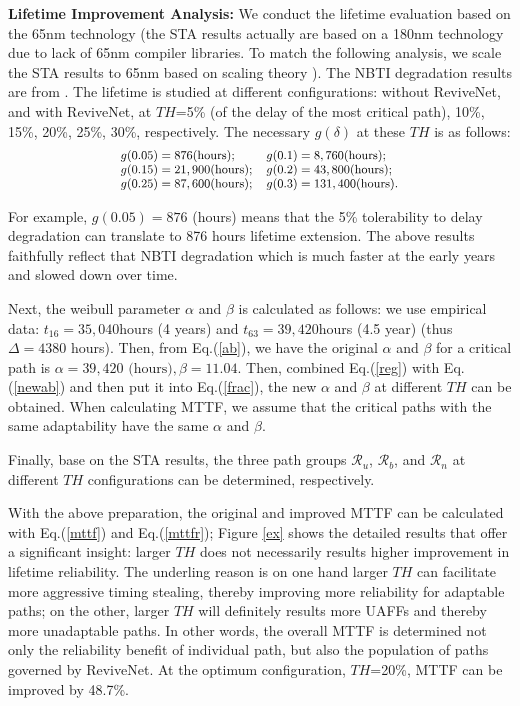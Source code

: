 \textbf{Lifetime Improvement Analysis:} We conduct the lifetime evaluation based on the 65nm technology (the STA results actually are based
on a 180nm technology due to lack of 65nm compiler libraries. To match the following analysis, we
scale the STA results to 65nm based on scaling theory \cite{JMRabaey}). The NBTI degradation
results are from \cite{wang2007impact}. The lifetime is studied at different configurations:
without ReviveNet, and with ReviveNet, at $TH$=5\% (of the delay of the most critical path), 10\%,
15\%, 20\%, 25\%, 30\%, respectively. The necessary $g(\delta)$ at these $TH$ is as follows:
\begin{equation}\label{reg}{\small
\begin{array}{ll}
g(0.05)=876 \mbox{(hours)}; &g(0.1)=8,760 \mbox{(hours)};\\
g(0.15)=21,900 \mbox{(hours)};& g(0.2)=43,800 \mbox{(hours)};\\
g(0.25)=87,600 \mbox{(hours)};& g(0.3)=131,400 \mbox{(hours)}.
\end{array}}
\end{equation}

For example, $g(0.05)=876$ (hours) means that the 5\% tolerability to delay degradation can
translate to 876 hours lifetime extension. The above results faithfully reflect that NBTI
degradation which is much faster at the early years and slowed down over time.

Next, the weibull parameter $\alpha$ and $\beta$ is calculated as follows: we use empirical data:
$t_{16}=35,040$hours (4 years) and $t_{63}=39,420$hours (4.5 year) (thus $\Delta=4380$ hours).
Then, from Eq.(\ref{ab}), we have the original $\alpha$ and $\beta$ for a critical path is
$\alpha=39,420 \mbox{ (hours)}, \beta=11.04$.
Then, combined Eq.(\ref{reg}) with Eq.(\ref{newab}) and then put it into Eq.(\ref{frac}), the new
$\alpha$ and $\beta$ at different $TH$ can be obtained. When calculating MTTF, we
assume that the critical paths with the same adaptability have the same $\alpha$ and $\beta$.

Finally, base on the STA results, the three path groups $\mathcal{R}_u$, $\mathcal{R}_b$, and
$\mathcal{R}_n$ at different $TH$ configurations can be determined, respectively.

With the above preparation, the original and improved MTTF can be calculated with Eq.(\ref{mttf})
and Eq.(\ref{mttfr}); Figure \ref{ex} shows the detailed results that offer a significant insight: larger $TH$ does not necessarily results higher improvement in lifetime reliability.
The underling reason is on one hand larger $TH$ can facilitate more aggressive timing stealing, thereby
improving more reliability for adaptable paths; on the other, larger $TH$ will definitely results
more UAFFs and thereby more unadaptable paths. In other words, the overall MTTF is determined not
only the reliability benefit of individual path, but also the population of paths governed by
ReviveNet. At the optimum configuration, $TH$=20\%, MTTF can be improved by 48.7\%.

